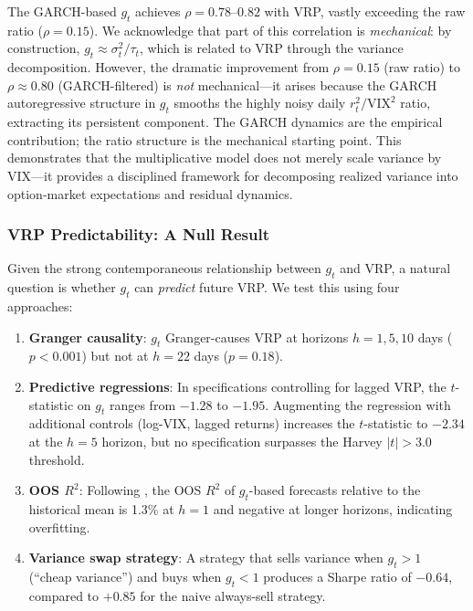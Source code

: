 \documentclass[12pt,a4paper]{article}
\begin{document}
The GARCH-based $g_t$ achieves $\rho = 0.78$--$0.82$ with VRP, vastly exceeding the raw ratio ($\rho = 0.15$). We acknowledge that part of this correlation is \emph{mechanical}: by construction, $g_t \approx \sigma_t^2 / \tau_t$, which is related to VRP through the variance decomposition. However, the dramatic improvement from $\rho = 0.15$ (raw ratio) to $\rho \approx 0.80$ (GARCH-filtered) is \emph{not} mechanical---it arises because the GARCH autoregressive structure in $g_t$ smooths the highly noisy daily $r_t^2/\mathrm{VIX}^2$ ratio, extracting its persistent component. The GARCH dynamics are the empirical contribution; the ratio structure is the mechanical starting point. This demonstrates that the multiplicative model does not merely scale variance by VIX---it provides a disciplined framework for decomposing realized variance into option-market expectations and residual dynamics.

\subsubsection{VRP Predictability: A Null Result}

Given the strong contemporaneous relationship between $g_t$ and VRP, a natural question is whether $g_t$ can \emph{predict} future VRP. We test this using four approaches:

\begin{enumerate}
\item \textbf{Granger causality}: $g_t$ Granger-causes VRP at horizons $h = 1, 5, 10$ days ($p < 0.001$) but not at $h = 22$ days ($p = 0.18$).

\item \textbf{Predictive regressions}: In specifications controlling for lagged VRP, the \citet{newey1987} $t$-statistic on $g_t$ ranges from $-1.28$ to $-1.95$. Augmenting the regression with additional controls (log-VIX, lagged returns) increases the $t$-statistic to $-2.34$ at the $h=5$ horizon, but no specification surpasses the Harvey $|t| > 3.0$ threshold.

\item \textbf{OOS $R^2$}: Following \citet{campbell2008}, the OOS $R^2$ of $g_t$-based forecasts relative to the historical mean is 1.3\% at $h=1$ and negative at longer horizons, indicating overfitting.

\item \textbf{Variance swap strategy}: A strategy that sells variance when $g_t > 1$ (``cheap variance'') and buys when $g_t < 1$ produces a Sharpe ratio of $-0.64$, compared to $+0.85$ for the naive always-sell strategy.
\end{enumerate}
\end{document}
